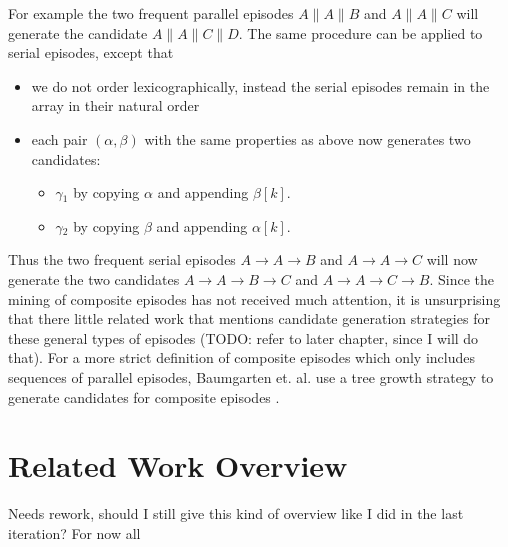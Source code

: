 For example the two frequent parallel episodes $A \| A \| B$ and $A \| A \| C$ will generate the candidate $A \| A \| C \| D$. \newline
The same procedure can be applied to serial episodes, except that
\begin{itemize}
	\item we do not order lexicographically, instead the serial episodes remain in the array in their natural order
	\item each pair $(\alpha , \beta )$ with the same properties as above now generates two candidates:
	\begin{itemize}
		\item $\gamma{_1}$ by copying $\alpha$ and appending $\beta [k]$.
		\item $\gamma{_2}$ by copying $\beta$ and appending $\alpha [k]$.
	\end{itemize}
\end{itemize}

Thus the two frequent serial episodes $A \rightarrow A \rightarrow B$ and $A \rightarrow A \rightarrow C$ will now generate the two candidates $A \rightarrow A \rightarrow B \rightarrow C$ and $A \rightarrow A \rightarrow C \rightarrow B$. \newline
Since the mining of composite episodes has not received much attention, it is unsurprising that there little related work that mentions candidate generation strategies for these general types of episodes (TODO: refer to later chapter, since I will do that). For a more strict definition of composite episodes which only includes sequences of parallel episodes, Baumgarten et. al. use a tree growth strategy to generate candidates for composite episodes \cite{baumgarten2003tree}. %


\section{Related Work Overview}
\label{section_related}

Needs rework, should I still give this kind of overview like I did in the last iteration? For now all 


